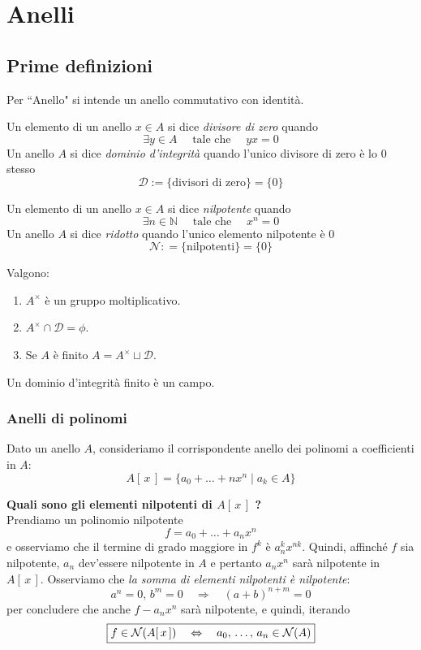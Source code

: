 \setcounter{section}{0} %
\section{Anelli}
\subsection{Prime definizioni}
\begin{multicols}{2}
Per \textquotedblleft Anello" si intende un anello commutativo con identità.

\begin{definition}[Divisori di 0]
	Un elemento di un anello $ x \in A $ si dice \emph{divisore di zero} quando
	\[ \exists y \in A \quad\text{    tale che    }\quad yx = 0 \]
	Un anello $ A $ si dice \emph{dominio d'integrità} quando l'unico divisore di zero è lo 0 stesso
	\[ \mathcal{D}:= \{\text{divisori di zero}\} = \{0\} \]
\end{definition}
\begin{definition}[Nilpotenza]
	Un elemento di un anello $ x \in A $ si dice \emph{nilpotente} quando
	 \[ \exists n \in \mathbb{N} \quad\text{    tale che    }\quad x^n = 0 \]
	 Un anello $ A $ si dice \emph{ridotto} quando l'unico elemento nilpotente è 0
	 \[ \mathcal{N}: = \{\text{nilpotenti}\} = \{0\} \]
\end{definition}

\begin{prop}
	Valgono:
	\begin{enumerate}
		\item $ A^\times $ è un gruppo moltiplicativo.
		\item $ A^\times \cap \mathcal{D} = \phi $.
		\item Se $ A $ è finito $ A = A^\times \sqcup \mathcal{D} $.
	\end{enumerate}
\end{prop}
\begin{remark}
	Un dominio d'integrità finito è un campo.
\end{remark}

\subsubsection{Anelli di polinomi}
Dato un anello $ A $, consideriamo il corrispondente anello dei polinomi a coefficienti in $ A $: $$  A[\,x\,] = \{ a_0 + \dots + n x^n \mid a_k \in A \}  $$

\textbf{Quali sono gli elementi nilpotenti di $ A[\,x\,] $ ?} \\
Prendiamo un polinomio nilpotente 
\[ f = a_0 + \dots + a_nx^n \]
e osserviamo che il termine di grado maggiore in $ f^k $ è $ a_n^kx^{nk} $. Quindi, affinché $ f $ sia nilpotente, $ a_n $ dev'essere nilpotente in $ A $ e pertanto $ a_nx^n $ sarà nilpotente in $ A[\, x\,] $. Osserviamo che \emph{la somma di elementi nilpotenti è nilpotente}:
\[ a^n = 0,\, b^m = 0 \quad\Rightarrow\quad (a+b)^{n+m} = 0 \]
per concludere che anche $ f-a_nx^n $ sarà nilpotente, e quindi, iterando
\[ \boxed{f \in \mathcal{N}(A[\,x\,]) \quad\Leftrightarrow\quad a_0, \,\dots,\, a_n \in \mathcal{N}(A)}  \]


\end{multicols}
